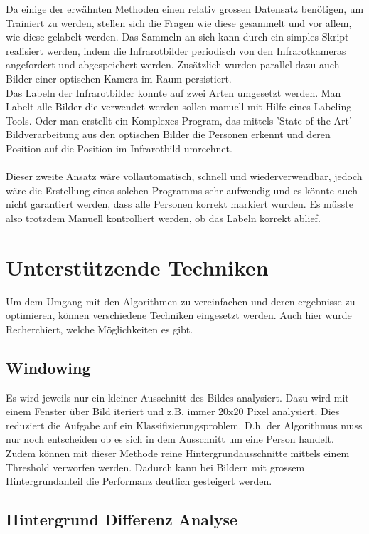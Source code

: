 Da einige der erwähnten Methoden einen relativ grossen Datensatz benötigen, um Trainiert zu werden, stellen sich die Fragen wie diese gesammelt und vor allem, wie diese gelabelt werden. Das Sammeln an sich kann durch ein simples Skript realisiert werden, indem die Infrarotbilder periodisch von den Infrarotkameras angefordert und abgespeichert werden. Zusätzlich wurden parallel dazu auch Bilder einer optischen Kamera im Raum persistiert.\\
Das Labeln der Infrarotbilder konnte auf zwei Arten umgesetzt werden. Man Labelt alle Bilder die verwendet werden sollen manuell mit Hilfe eines Labeling Tools. Oder man erstellt ein Komplexes Program, das mittels 'State of the Art' Bildverarbeitung aus den optischen Bilder die Personen erkennt und deren Position auf die Position im Infrarotbild umrechnet.\\
\\
Dieser zweite Ansatz wäre vollautomatisch, schnell und wiederverwendbar, jedoch wäre die Erstellung eines solchen Programms sehr aufwendig und es könnte auch nicht garantiert werden, dass alle Personen korrekt markiert wurden. Es müsste also trotzdem Manuell kontrolliert werden, ob das Labeln korrekt ablief. 

\section{Unterstützende Techniken}

Um dem Umgang mit den Algorithmen zu vereinfachen und deren ergebnisse zu optimieren, können verschiedene Techniken eingesetzt werden. Auch hier wurde Recherchiert, welche Möglichkeiten es gibt.

\subsection{Windowing}

Es wird jeweils nur ein kleiner Ausschnitt des Bildes analysiert. Dazu wird mit einem Fenster über Bild iteriert und z.B. immer 20x20 Pixel analysiert. Dies reduziert die Aufgabe auf ein Klassifizierungsproblem. D.h. der Algorithmus muss nur noch entscheiden ob es sich in dem Ausschnitt um eine Person handelt. Zudem können mit dieser Methode reine Hintergrundausschnitte mittels einem Threshold verworfen werden. Dadurch kann bei Bildern mit grossem Hintergrundanteil die Performanz deutlich gesteigert werden.

\subsection{Hintergrund Differenz Analyse}

